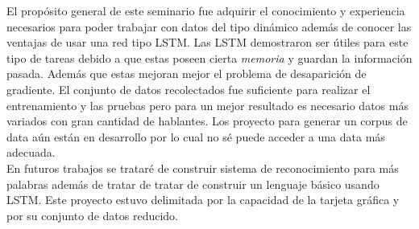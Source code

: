 El propósito general de este seminario  fue adquirir el conocimiento y
experiencia necesarios para poder trabajar con datos del tipo dinámico además de conocer las ventajas de usar una red tipo LSTM.
Las LSTM demostraron ser útiles para este tipo de tareas debido a que estas poseen cierta \textit{memoria} y guardan la información pasada. Además que estas mejoran mejor el problema de desaparición de gradiente.
El conjunto de datos recolectados fue suficiente para realizar el entrenamiento y las pruebas pero para un mejor resultado es necesario datos más variados con gran cantidad de hablantes. Los proyecto para generar un corpus de data aún están en desarrollo por lo cual no sé puede acceder a una data más adecuada.\\
En futuros trabajos se trataré de construir sistema de reconocimiento para más palabras además de tratar de tratar de construir un lenguaje básico usando LSTM. Este proyecto estuvo delimitada por la capacidad de la tarjeta gráfica y por su conjunto de datos reducido. 

